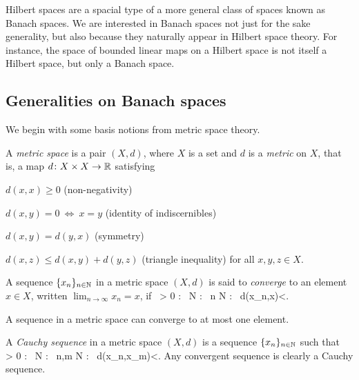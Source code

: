 
Hilbert spaces are a spacial type of a more general class of spaces known as Banach spaces. We are interested in Banach spaces not just for the sake generality, but also because they naturally appear in Hilbert space theory. For instance, the space of bounded linear maps on a Hilbert space is not itself a Hilbert space, but only a Banach space.

\subsection{Generalities on Banach spaces}

We begin with some basis notions from metric space theory.

\bd
A \emph{metric space} is a pair $(X,d)$, where $X$ is a set and $d$ is a \emph{metric} on $X$, that is, a map $d\colon X\times X \to \mathbb{R}$ satisfying
\ben[label=(\roman*)]
\item $d(x,x)\geq 0$ \hfill (non-negativity)
\item $d(x,y) = 0\ \Leftrightarrow \ x=y$ \hfill (identity of indiscernibles)
\item $d(x,y)=d(y,x)$ \hfill (symmetry)
\item $d(x,z)\leq d(x,y)+d(y,z)$ \hfill (triangle inequality)
\een
for all $x,y,z\in X$.
\ed

\bd
A sequence $\{x_n\}_{n\in \mathbb{N}}$ in a metric space $(X,d)$ is said to \emph{converge} to an element $x\in X$, written $\displaystyle \lim_{n\to \infty}x_n=x$, if
\bse
\forall \, \varepsilon > 0 : \exists \, N \in \N : \forall \, n \geq N : \ d(x_n,x)<\varepsilon.
\ese
\ed

A sequence in a metric space can converge to at most one element.

\bd
A \emph{Cauchy sequence} in a metric space $(X,d)$ is a sequence $\{x_n\}_{n\in \mathbb{N}}$ such that
\bse
\forall \, \varepsilon > 0 : \exists \, N \in \N : \forall \, n,m \geq N : \ d(x_n,x_m)<\varepsilon.
\ese
\ed
Any convergent sequence is clearly a Cauchy sequence.

